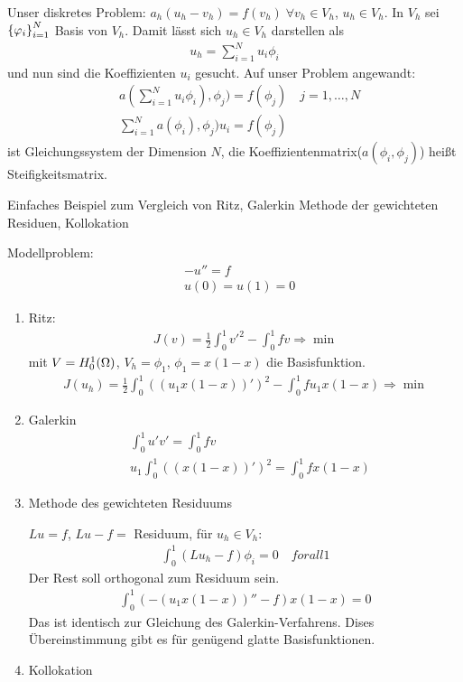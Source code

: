 Unser diskretes Problem: $a_h (u_h- v_h) = f(v_h) \; \forall v_h \in V_h $, $u_h \in V_h$. 
In $V_h$ sei $\left\{ \varphi_i \right\}_{i = 1}^N$ Basis von $V_h$. Damit lässt sich $u_h \in V_h$ darstellen als
\begin{align*}
  u_h = \sum_{i = 1}^N u_i \phi_i
\end{align*}
und nun sind die Koeffizienten $u_i$ gesucht. Auf unser Problem angewandt:
\begin{align*}
&  a(\sum_{i = 1}^N u_i \phi_i), \phi_j) = f(\phi_j) \quad j=1, \dots, N\\
&  \sum_{i = 1}^N a( \phi_i), \phi_j)u_i = f(\phi_j) 
\end{align*}
ist Gleichungssystem der Dimension $N$, die Koeffizientenmatrix($a(\phi_i, \phi_j)$) heißt Steifigkeitsmatrix.

\begin{beispiel} Einfaches Beispiel zum Vergleich von Ritz, Galerkin Methode der gewichteten Residuen, Kollokation

Modellproblem:
  \begin{align*}
 &   -u'' = f\\
&u(0) = u(1) = 0
  \end{align*}
  \begin{enumerate}
  \item Ritz: 
    \begin{align*}
      J(v) = \frac 1 2 \int_0^1v'^2 - \int_0^1 f v \Rightarrow \min
    \end{align*}
    mit $V = H^1_0(\Omega)$, $V_h = {\phi_1}$, $\phi_1 = x(1-x)$ die Basisfunktion.
    \begin{align*}
      J(u_h) = \frac 1 2 \int_0^1((u_1x(1-x))')^2 - \int_0^1 f u_1x(1-x) \Rightarrow \min
    \end{align*}
  \item Galerkin
    \begin{align*}
      &\int_0^1u' v' = \int_0^1 f v\\
      &u_1\int_0^1((x(1-x))')^2 = \int_0^1fx(1-x)
\end{align*}
  \item Methode des gewichteten Residuums

$Lu = f$, $Lu-f =$ Residuum, für $u_h \in V_h$:
    \begin{align*}
      \int_0^1(L u_h- f)\phi_i = 0 \quad forall 1 
    \end{align*}
    Der Rest soll orthogonal zum Residuum sein.
    \begin{align*}
      \int_0^1 (-(u_1x(1-x))'' -f)x(1-x) = 0
    \end{align*}
    Das ist identisch zur Gleichung des Galerkin-Verfahrens. Dises Übereinstimmung gibt es für genügend glatte Basisfunktionen. 
  \item Kollokation


\end{enumerate}
\end{beispiel}
